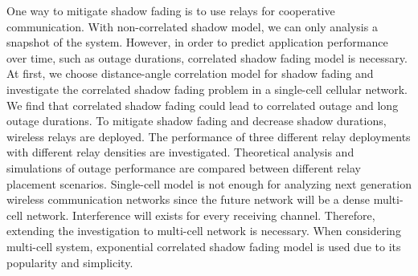 \par One way to mitigate shadow fading is to use relays for cooperative communication. With non-correlated shadow model, we can only analysis a snapshot of the system. However, in order to predict application performance over time, such as outage durations, correlated shadow fading model is necessary. At first, we choose distance-angle correlation model \cite{szyszkowicz2010feasibility} for shadow fading and investigate the correlated shadow fading problem in a single-cell cellular network. We find that correlated shadow fading could lead to correlated outage and long outage durations.  To mitigate shadow fading and decrease shadow durations, wireless relays are deployed. The performance of three different relay deployments with different relay densities are investigated. Theoretical analysis and simulations of outage performance are compared between different relay placement scenarios. 
Single-cell model is not enough for analyzing next generation wireless communication networks since the future network will be a dense multi-cell network. Interference will exists for every receiving channel. Therefore, extending the investigation to multi-cell network is necessary. When considering multi-cell system, exponential correlated shadow fading model is used due to its popularity and simplicity. 

